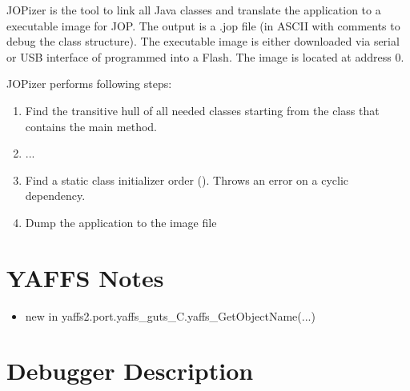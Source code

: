 JOPizer is the tool to link all Java classes and translate the
application to a executable image for JOP. The output is a .jop file
(in ASCII with comments to debug the class structure). The
executable image is either downloaded via serial or USB interface of
programmed into a Flash. The image is located at address 0.

JOPizer performs following steps:

\begin{enumerate}
    \item Find the transitive hull of all needed classes starting
    from the class that contains the main method.
    \item ...
    \item Find a static class initializer order
    (). Throws an error on a cyclic dependency.
    \item Dump the application to the image file
\end{enumerate}

\section{YAFFS Notes}

\begin{itemize}
    \item new in yaffs2.port.yaffs\_guts\_C.yaffs\_GetObjectName(...)
\end{itemize}

\section{Debugger Description}


